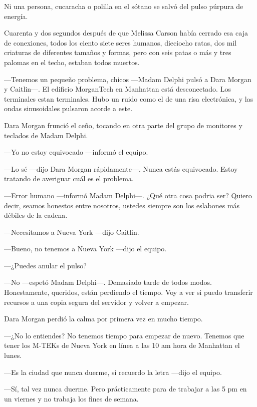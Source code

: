 Ni una persona, cucaracha o polilla en el sótano se salvó del pulso
púrpura de energía.

Cuarenta y dos segundos después de que Melissa Carson había cerrado esa
caja de conexiones, todos los ciento siete seres humanos, dieciocho
ratas, dos mil criaturas de diferentes tamaños y formas, pero con seis
patas o más y tres palomas en el techo, estaban todos muertos.

---Tenemos un pequeño problema, chicos ---Madam Delphi pulsó a Dara
Morgan y Caitlin---. El edificio MorganTech en Manhattan está
desconectado. Los terminales estan terminales. Hubo un ruido como el de
una risa electrónica, y las ondas sinusoidales pulsaron acorde a este.

Dara Morgan frunció el ceño, tocando en otra parte del grupo de
monitores y teclados de Madam Delphi.

---Yo no estoy equivocado ---informó el equipo.

---Lo sé ---dijo Dara Morgan rápidamente---. Nunca estás equivocado.
Estoy tratando de averiguar cuál es el problema.

---Error humano ---informó Madam Delphi---. ¿Qué otra cosa podria ser?
Quiero decir, seamos honestos entre nosotros, ustedes siempre son los
eslabones más débiles de la cadena.

---Necesitamos a Nueva York ---dijo Caitlin.

---Bueno, no tenemos a Nueva York ---dijo el equipo.

---¿Puedes anular el pulso?

---No ---espetó Madam Delphi---. Demasiado tarde de todos modos.
Honestamente, queridos, están perdiendo el tiempo. Voy a ver si puedo
transferir recursos a una copia segura del servidor y volver a empezar.

Dara Morgan perdió la calma por primera vez en mucho tiempo.

---¿No lo entiendes? No tenemos tiempo para empezar de nuevo. Tenemos
que tener los M-TEKs de Nueva York en línea a las 10 am hora de
Manhattan el lunes.

---Es la ciudad que nunca duerme, si recuerdo la letra ---dijo el
equipo.

---Sí, tal vez nunca duerme. Pero prácticamente para de trabajar a las 5
pm en un viernes y no trabaja los fines de semana.

